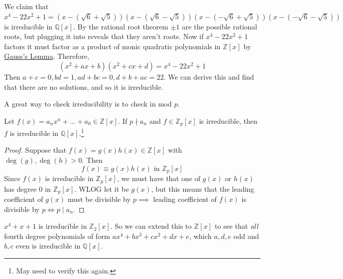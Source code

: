   \begin{example}[Factoring $x^4 - 22x^2 + 1$]
    \label{ex:factoring-x422x21}
    We claim that $x^4 - 22x^2 + 1 = (x - (\sqrt{6} + \sqrt{5})) (x - (\sqrt{6} - \sqrt{5})) (x - (-\sqrt{6} + \sqrt{5})) (x - (-\sqrt{6} - \sqrt{5})) $ is irreducible in $\mathbb{Q} [x]$. By the rational root theorem $\pm 1$ are the possible rational roots, but plugging it into reveals that they aren't roots. Now if $x^4 - 22x^2 + 1$ factors it must factor as a product of monic quadratic polynomials in $\mathbb{Z}[x]$ by \hyperref[thm:gausss-lemma]{Gauss's Lemma}. Therefore, 
    \begin{equation}
      (x^2 + ax + b) (x^2 + cx + d) = x^4 - 22x^2 + 1
    \end{equation}
    Then $a + c = 0, bd = 1, ad + bc = 0, d + b + ac = 22$. We can derive this and find that there are no solutions, and so it is irreducible. 
  \end{example}

  A great way to check irreducibility is to check in mod $p$. 

  \begin{theorem}
    \label{thm:irreducibility-via-reduction-modulo-p}
    Let $f(x) = a_n x^n + \ldots + a_0 \in \mathbb{Z}[x]$. If $p \nmid a_n$ and $f \in \mathbb{Z}_p [x]$ is irreducible, then $f$ is irreducible in $\mathbb{Q}[x]$.\footnote{May need to verify this again.}
  \end{theorem}
  \begin{proof}
    Suppose that $f(x) = g(x) h(x) \in \mathbb{Z}[x]$ with $\deg(g), \deg(h) > 0$. Then 
    \begin{equation}
      f(x) \equiv g(x) h(x) \text{ in } \mathbb{Z}_p [x]
    \end{equation}
    Since $f(x)$ is irreducible in $\mathbb{Z}_p [x]$, we must have that one of $g(x)$ or $h(x)$ has degree $0$ in $\mathbb{Z}_p [x]$. WLOG let it be $g(x)$, but this means that the leading coefficient of $g(x)$ must be divisible by $p \implies$ leading coefficient of $f(x)$ is divisible by $p \iff p \mid a_n$. 
  \end{proof}

  \begin{example}
    \label{ex:irreducibility-of-x4x1-over-z2}
    $x^4 + x + 1$ is irreducible in $\mathbb{Z}_2 [x]$. So we can extend this to $\mathbb{Z}[x]$ to see that \textit{all} fourth degree polynomials of form $a x^4 + b x^3 + c x^2 + dx + e$, which $a, d, e$ odd and $b, c$ even is irreducible in $\mathbb{Q}[x]$. 
  \end{example}

